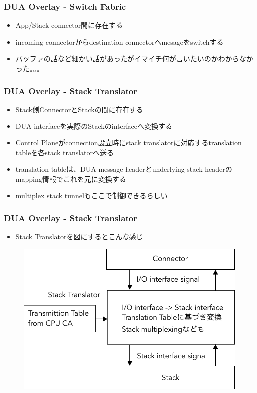 \documentclass[dvipdfmx,9pt,notheorems]{beamer}
\theoremstyle{definition}
\begin{document}
\begin{frame}\frametitle{DUA Overlay - Switch Fabric}
	\begin{itemize}
		\item App/Stack connector間に存在する
		\item incoming connectorからdestination connectorへmesageをswitchする
		\item バッファの話など細かい話があったがイマイチ何が言いたいのかわからなかった。。。
	\end{itemize}
\pnote{
}
\end{frame}

\begin{frame}\frametitle{DUA Overlay - Stack Translator}
	\begin{itemize}
		\item Stack側ConnectorとStackの間に存在する
		\item DUA interfaceを実際のStackのinterfaceへ変換する
		\item Control Planeがconnection設立時にstack translatorに対応するtranslation tableを各stack translatorへ送る
		\item translation tableは、DUA message headerとunderlying stack headerのmapping情報でこれを元に変換する
		\item multiplex stack tunnelもここで制御できるらしい
	\end{itemize}
\pnote{
}
\end{frame}

\begin{frame}\frametitle{DUA Overlay - Stack Translator}
	\begin{itemize}
		\item Stack Translatorを図にするとこんな感じ
		\end{itemize}
  \begin{figure}[htb]
		\includegraphics[scale=0.5]{fig/ez_DUA_DataPlane_StackTranslator.pdf}
  \end{figure}
\pnote{
}
\end{frame}
\end{document}

